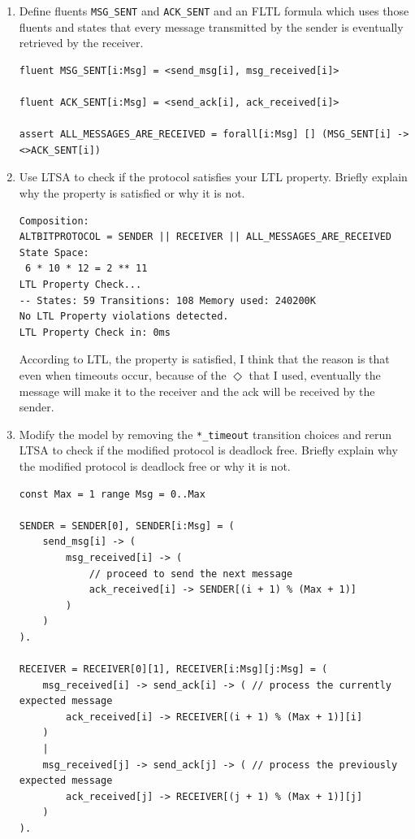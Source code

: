 \documentclass{article}
\begin{document}
\begin{enumerate}
\begin{enumerate}
\item Define fluents \verb"MSG_SENT" and \verb"ACK_SENT" and an FLTL
formula which uses those fluents and states that every message
transmitted by the sender is eventually retrieved by the receiver.

\begin{verbatim}
fluent MSG_SENT[i:Msg] = <send_msg[i], msg_received[i]>

fluent ACK_SENT[i:Msg] = <send_ack[i], ack_received[i]>

assert ALL_MESSAGES_ARE_RECEIVED = forall[i:Msg] [] (MSG_SENT[i] -> <>ACK_SENT[i])
\end{verbatim}

\item Use LTSA to check if the protocol satisfies your LTL property. Briefly explain why the property is satisfied or why it is not.

\begin{verbatim}
Composition:
ALTBITPROTOCOL = SENDER || RECEIVER || ALL_MESSAGES_ARE_RECEIVED
State Space:
 6 * 10 * 12 = 2 ** 11
LTL Property Check...
-- States: 59 Transitions: 108 Memory used: 240200K
No LTL Property violations detected.
LTL Property Check in: 0ms
\end{verbatim}

According to LTL, the property is satisfied, I think that the reason is that even when timeouts occur, because of the $\Diamond$ that I used, eventually the message will make it to the receiver and the ack will be received by the sender.

\item Modify the model by removing the \verb"*_timeout" transition
choices and rerun LTSA to check if the modified protocol is deadlock
free. Briefly explain why the modified protocol is deadlock free or why it is not.
\begin{verbatim}
const Max = 1 range Msg = 0..Max

SENDER = SENDER[0], SENDER[i:Msg] = (
    send_msg[i] -> (
        msg_received[i] -> (
            // proceed to send the next message
            ack_received[i] -> SENDER[(i + 1) % (Max + 1)]
        )
    )
).

RECEIVER = RECEIVER[0][1], RECEIVER[i:Msg][j:Msg] = (
    msg_received[i] -> send_ack[i] -> ( // process the currently expected message
        ack_received[i] -> RECEIVER[(i + 1) % (Max + 1)][i]
    )
    |
    msg_received[j] -> send_ack[j] -> ( // process the previously expected message
        ack_received[j] -> RECEIVER[(j + 1) % (Max + 1)][j]
    )
).


\end{verbatim}
\end{enumerate}
\end{enumerate}
\end{document}
